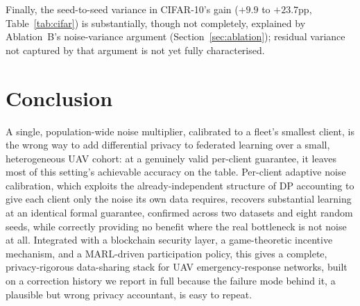 \documentclass[journal]{IEEEtran}
\begin{document}
Finally, the seed-to-seed variance in CIFAR-10's gain ($+9.9$ to
$+23.7$pp, Table~\ref{tab:cifar}) is substantially, though not
completely, explained by Ablation~B's noise-variance argument
(Section~\ref{sec:ablation}); residual variance not captured by that
argument is not yet fully characterised.

\section{Conclusion}
\label{sec:conclusion}

A single, population-wide noise multiplier, calibrated to a fleet's
smallest client, is the wrong way to add differential privacy to
federated learning over a small, heterogeneous UAV cohort: at a
genuinely valid per-client guarantee, it leaves most of this setting's
achievable accuracy on the table. Per-client adaptive noise
calibration, which exploits the already-independent structure of DP
accounting to give each client only the noise its own data requires,
recovers substantial learning at an identical formal guarantee,
confirmed across two datasets and eight random seeds, while correctly
providing no benefit where the real bottleneck is not noise at all.
Integrated with a blockchain security layer, a game-theoretic incentive
mechanism, and a MARL-driven participation policy, this gives a
complete, privacy-rigorous data-sharing stack for UAV emergency-response
networks, built on a correction history we report in full because the
failure mode behind it, a plausible but wrong privacy accountant, is
easy to repeat.



\end{document}
